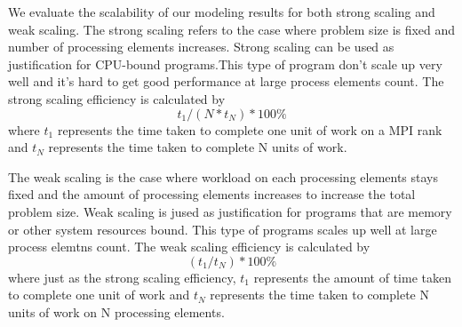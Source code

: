 
We evaluate the scalability of our modeling results for both strong scaling and weak scaling. The strong scaling refers to the case where problem size is fixed and number of processing elements increases. Strong scaling can be used as justification for CPU-bound programs.This type of program don't scale up very well and it's hard to get good performance at large process elements count. The strong scaling efficiency is calculated by
\begin{equation*}
t_1 / ( N * t_N ) * 100\% 
\end{equation*}
where $t_1$ represents the time taken to complete one unit of work on a MPI rank and $t_N$ represents the time taken to complete N units of work. 

The weak scaling is the case where workload on each processing elements stays fixed and the amount of processing elements increases to increase the total problem size. Weak scaling is jused as justification for programs that are memory or other system resources bound. This type of programs scales up well at large process elemtns count. The weak scaling efficiency is calculated by
\begin{equation*}
( t_1 / t_N ) * 100\% 
\end{equation*}
where just as the strong scaling efficiency, $t_1$ represents the amount of time taken to complete one unit of work and $t_N$ represents the time taken to complete N units of work on N processing elements.